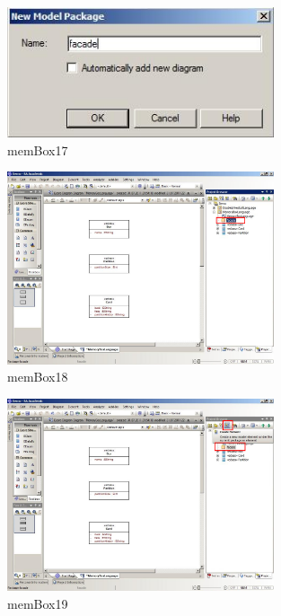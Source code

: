\begin{figure}[htbp]
	\centering
  \includegraphics[width=0.7\textwidth]{pics/memBox17.png}
	\caption{memBox17}
	\label{memBox17}
\end{figure}

\begin{figure}[htbp]
	\centering
  \includegraphics[width=0.7\textwidth]{pics/memBox18.png}
	\caption{memBox18}
	\label{memBox18}
\end{figure}

\clearpage

\begin{figure}[htbp]
	\centering
  \includegraphics[width=0.7\textwidth]{pics/memBox19.png}
	\caption{memBox19}
	\label{memBox19}
\end{figure}

